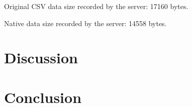 \documentclass[conference]{IEEEtran}
\begin{document}
Original CSV data size recorded by the server: 17160 bytes.

Native data size recorded by the server: 14558 bytes.

\section{Discussion}

\section{Conclusion}



\end{document}
